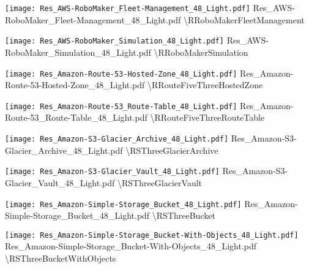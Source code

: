  {\texttt{[image: Res\_AWS-RoboMaker\_Fleet-Management\_48\_Light.pdf]}} {Res\_AWS-RoboMaker\_Fleet-Management\_48\_Light.pdf} {{\textbackslash}RRoboMakerFleetManagement}

 {\texttt{[image: Res\_AWS-RoboMaker\_Simulation\_48\_Light.pdf]}} {Res\_AWS-RoboMaker\_Simulation\_48\_Light.pdf} {{\textbackslash}RRoboMakerSimulation}

 {\texttt{[image: Res\_Amazon-Route-53-Hosted-Zone\_48\_Light.pdf]}} {Res\_Amazon-Route-53-Hosted-Zone\_48\_Light.pdf} {{\textbackslash}RRouteFiveThreeHostedZone}

 {\texttt{[image: Res\_Amazon-Route-53\_Route-Table\_48\_Light.pdf]}} {Res\_Amazon-Route-53\_Route-Table\_48\_Light.pdf} {{\textbackslash}RRouteFiveThreeRouteTable}

 {\texttt{[image: Res\_Amazon-S3-Glacier\_Archive\_48\_Light.pdf]}} {Res\_Amazon-S3-Glacier\_Archive\_48\_Light.pdf} {{\textbackslash}RSThreeGlacierArchive}

 {\texttt{[image: Res\_Amazon-S3-Glacier\_Vault\_48\_Light.pdf]}} {Res\_Amazon-S3-Glacier\_Vault\_48\_Light.pdf} {{\textbackslash}RSThreeGlacierVault}

 {\texttt{[image: Res\_Amazon-Simple-Storage\_Bucket\_48\_Light.pdf]}} {Res\_Amazon-Simple-Storage\_Bucket\_48\_Light.pdf} {{\textbackslash}RSThreeBucket}

 {\texttt{[image: Res\_Amazon-Simple-Storage\_Bucket-With-Objects\_48\_Light.pdf]}} {Res\_Amazon-Simple-Storage\_Bucket-With-Objects\_48\_Light.pdf} {{\textbackslash}RSThreeBucketWithObjects}

